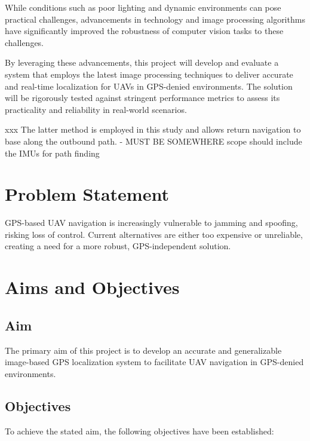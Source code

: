 While conditions such as poor lighting and dynamic environments can pose practical challenges, advancements in technology and image processing algorithms have significantly improved the robustness of computer vision tasks to these challenges.

By leveraging these advancements, this project will develop and evaluate a system that employs the latest image processing techniques to deliver accurate and real-time localization for UAVs in GPS-denied environments. The solution will be rigorously tested against stringent performance metrics to assess its practicality and reliability in real-world scenarios.


 xxx
The latter method is employed in this study and allows return navigation to base along the outbound path.  - MUST BE SOMEWHERE 
scope should include the IMUs for path finding


\section{Problem Statement}
GPS-based UAV navigation is increasingly vulnerable to jamming and spoofing, risking loss of control. Current alternatives are either too expensive or unreliable, creating a need for a more robust, GPS-independent solution.

\section{Aims and Objectives}
\subsection{Aim}
The primary aim of this project is to develop an accurate and generalizable image-based GPS localization system to facilitate UAV navigation in GPS-denied environments.

\subsection{Objectives}
To achieve the stated aim, the following objectives have been established:

